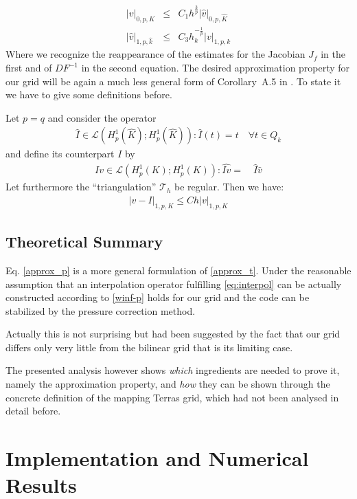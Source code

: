 \documentclass[times]{fldauth}
\begin{document}
\begin{eqnarray*}
|v|_{0,p,K} 		&\le& 	C_1	h^{\frac{3}{p}} |\hat v|_{0,p,\hat K}
\\
|\hat v|_{1,p,\hat{k}} 	&\le& 		C_3 h_k^{-\frac{1}{p}}|v|_{1,p,k}
\end{eqnarray*}
Where we recognize the reappearance of the estimates for the Jacobian $J_f$ in the first and of $DF^{-1}$ in the second equation. The desired approximation property for our grid will be again a much less general form of 
Corollary~A.5 in  \cite[p.~107]{GiraultRaviart}.
To state it we have to give some definitions before.

Let $p=q$ and consider the operator
\begin{eqnarray*}
\hat I \in \mathcal L(H^1_p(\hat K);H^1_p(\hat K)) : %
\hat I (t)=t \quad \forall t \in Q_k
\end{eqnarray*}
and define  its counterpart $I$ by
\begin{eqnarray*}
I v \in \mathcal L(H^1_p(K);H^1_p(K)) : %
\widehat{I v} = \quad \hat I \hat v 
\end{eqnarray*}
Let furthermore the ``triangulation'' $\mathcal{T}_h$ be regular.
Then we have:
\begin{eqnarray}
\label{approx_p}
|v-I |_{1,p,K} \le Ch|v|_{1,p,K}
\end{eqnarray}
\subsection{Theoretical Summary}
Eq. \eqref{approx_p} is a more general formulation of \eqref{approx_t}. 
Under the reasonable assumption that an interpolation operator fulfilling \eqref{eq:interpol} can be actually constructed according to \cite{scott1990finite} \eqref{winf-p} holds for our grid and the code can be stabilized by the pressure correction method. 

Actually this is not surprising but had been suggested by the fact that our grid differs only very little from the bilinear grid that is its limiting case. 

The presented analysis however shows \emph{which} ingredients are needed to prove it, namely the approximation property,  and \emph{how} they can be shown through the concrete definition of the mapping  Terras grid, which had not been analysed in detail before.   
\section{Implementation and Numerical Results}
\end{document}
